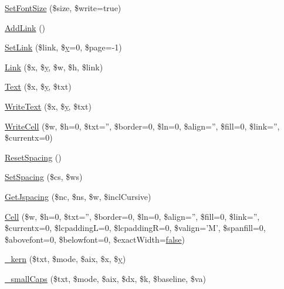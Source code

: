 \begin{DoxyCompactItemize}
\item 
\hyperlink{classm_p_d_f_a5a6b0a8aa9e58a58028cd4c187238b32}{Set\-Font\-Size} (\$size, \$write=true)
\item 
\hyperlink{classm_p_d_f_a1dcda4ed2e5f6e99be7ac0766d64e997}{Add\-Link} ()
\item 
\hyperlink{classm_p_d_f_a4378806cb8248b981f381d9cdcaf6688}{Set\-Link} (\$link, \$\hyperlink{example43___m_p_d_f_i__booklet_8php_a3f83be162d14f38451e1bc419fbbbcbc}{y}=0, \$page=-\/1)
\item 
\hyperlink{classm_p_d_f_a87841e8bc36d524186594abe7b5be3ad}{Link} (\$x, \$\hyperlink{example43___m_p_d_f_i__booklet_8php_a3f83be162d14f38451e1bc419fbbbcbc}{y}, \$w, \$h, \$link)
\item 
\hyperlink{classm_p_d_f_a7a095aa5f12c62d4587522b77078ecfe}{Text} (\$x, \$\hyperlink{example43___m_p_d_f_i__booklet_8php_a3f83be162d14f38451e1bc419fbbbcbc}{y}, \$txt)
\item 
\hyperlink{classm_p_d_f_a7df0ebc19b7c286777c6e451177aee3b}{Write\-Text} (\$x, \$\hyperlink{example43___m_p_d_f_i__booklet_8php_a3f83be162d14f38451e1bc419fbbbcbc}{y}, \$txt)
\item 
\hyperlink{classm_p_d_f_a19e38d570c2ddf9afd2c5f94b60945fc}{Write\-Cell} (\$w, \$h=0, \$txt='', \$border=0, \$ln=0, \$align='', \$fill=0, \$link='', \$currentx=0)
\item 
\hyperlink{classm_p_d_f_a79aff836ddc9c92495c3655a1df11f98}{Reset\-Spacing} ()
\item 
\hyperlink{classm_p_d_f_ae0333e8168146e0aaf025ee6f6fc1eba}{Set\-Spacing} (\$cs, \$ws)
\item 
\hyperlink{classm_p_d_f_a3487f3785f76f081542799184defc6b5}{Get\-Jspacing} (\$nc, \$ns, \$w, \$incl\-Cursive)
\item 
\hyperlink{classm_p_d_f_a83fc046c9d1464aca17a700684339383}{Cell} (\$w, \$h=0, \$txt='', \$border=0, \$ln=0, \$align='', \$fill=0, \$link='', \$currentx=0, \$lcpadding\-L=0, \$lcpadding\-R=0, \$valign='M', \$spanfill=0, \$abovefont=0, \$belowfont=0, \$exact\-Width=\hyperlink{ttfontsuni_8php_afbaa04e5cc97693dc668b3c45d3dd740}{false})
\item 
\hyperlink{classm_p_d_f_a0ca37e3c51146f105b6163c9a83ad115}{\-\_\-kern} (\$txt, \$mode, \$aix, \$x, \$\hyperlink{example43___m_p_d_f_i__booklet_8php_a3f83be162d14f38451e1bc419fbbbcbc}{y})
\item 
\hyperlink{classm_p_d_f_a2e8b25cb1c618c15abbbe649b88a39ce}{\-\_\-small\-Caps} (\$txt, \$mode, \$aix, \$dx, \$k, \$baseline, \$va)
\item 

\end{DoxyCompactItemize}
